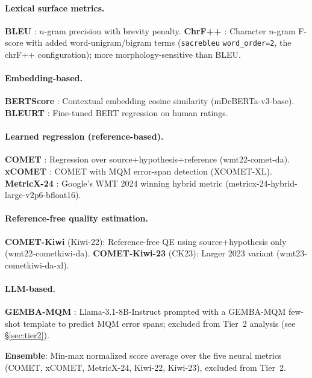 \documentclass[11pt]{article}
\begin{document}
\paragraph{Lexical surface metrics.}
\textbf{BLEU} \cite{papineni2002bleu}: $n$-gram precision with brevity penalty.
\textbf{ChrF++} \cite{popovic2015chrf}: Character $n$-gram F-score with added word-unigram/bigram terms (\texttt{sacrebleu} \texttt{word\_order=2}, the chrF++ configuration); more morphology-sensitive than BLEU.

\paragraph{Embedding-based.}
\textbf{BERTScore} \cite{zhang2019bertscore}: Contextual embedding cosine similarity (mDeBERTa-v3-base).
\textbf{BLEURT} \cite{sellam2020bleurt}: Fine-tuned BERT regression on human ratings.

\paragraph{Learned regression (reference-based).}
\textbf{COMET} \cite{rei2022comet22}: Regression over source+hypothesis+reference (wmt22-comet-da).
\textbf{xCOMET} \cite{guerreiro2023xcomet}: COMET with MQM error-span detection (XCOMET-XL).
\textbf{MetricX-24} \cite{juraska2024metricx}: Google's WMT 2024 winning hybrid metric (metricx-24-hybrid-large-v2p6-bfloat16).

\paragraph{Reference-free quality estimation.}
\textbf{COMET-Kiwi} \cite{rei2022cometkiwi} (Kiwi-22): Reference-free QE using source+hypothesis only (wmt22-cometkiwi-da).
\textbf{COMET-Kiwi-23} \cite{rei2023scaling} (CK23): Larger 2023 variant (wmt23-cometkiwi-da-xl).

\paragraph{LLM-based.}
\textbf{GEMBA-MQM} \cite{kocmi2023large,kocmi2023gembamqm}: Llama-3.1-8B-Instruct \cite{dubey2024llama3} prompted with a GEMBA-MQM few-shot template to predict MQM error spans; excluded from Tier~2 analysis (see \S\ref{sec:tier2}).

\noindent\textbf{Ensemble}: Min-max normalized score average over the five neural metrics (COMET, xCOMET, MetricX-24, Kiwi-22, Kiwi-23), excluded from Tier~2.
\end{document}
